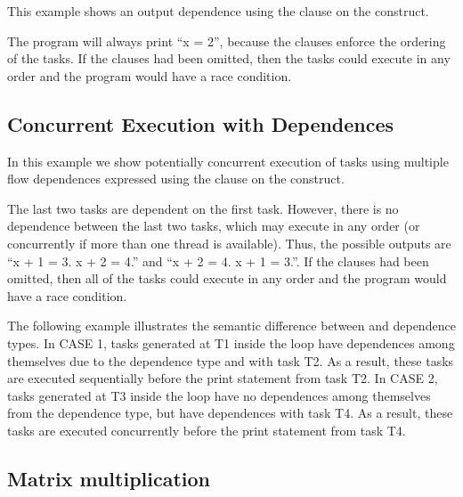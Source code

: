 This example shows an output dependence using the  
clause on the  construct.



The program will always print ``x = 2'', because the  
clauses enforce the ordering of the tasks. If the  clauses had been 
omitted, then the tasks could execute in any order and the program would have a 
race condition.

\pagebreak
\subsection{Concurrent Execution with Dependences}
\label{subsec:task_concurrent_depend}

In this example we show potentially concurrent execution of tasks using multiple 
flow dependences expressed using the  clause on the  
construct.

The last two tasks are dependent on the first task. However, there is no dependence 
between the last two tasks, which may execute in any order (or concurrently if 
more than one thread is available). Thus, the possible outputs are ``x 
+ 1 = 3. x + 2 = 4.'' and ``x + 2 = 4. x + 1 = 3.''. 
If the  clauses had been omitted, then all of the tasks could execute 
in any order and the program would have a race condition.



The following example illustrates the semantic difference between 
and  dependence types.  In CASE 1, tasks generated at T1
inside the loop have dependences among themselves due to 
the  dependence type and with task T2.
As a result, these tasks are executed sequentially before the print
statement from task T2.
In CASE 2, tasks generated at T3 inside the loop have no dependences
among themselves from the  dependence type, but have 
dependences with task T4.
As a result, these tasks are executed concurrently before the print
statement from task T4.



\subsection{Matrix multiplication}
\label{subsec:task_matrix_mult}

